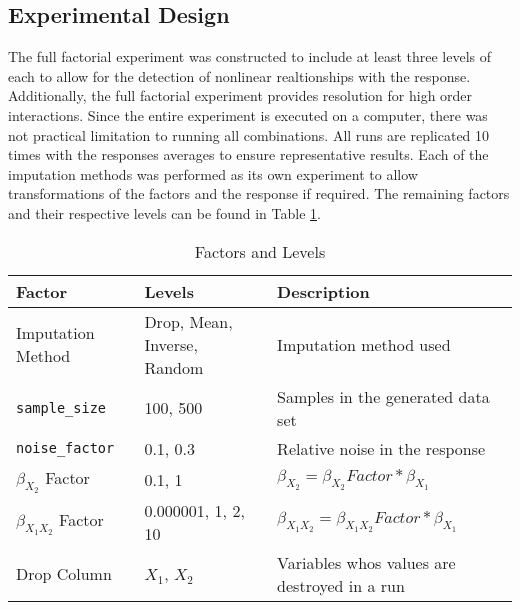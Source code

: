 \documentclass[../../paper.tex]{subfiles}
\begin{document}
\subsection{Experimental Design}
The full factorial experiment was constructed to include at least three levels of each to allow for the detection of nonlinear realtionships with the response.
Additionally, the full factorial experiment provides resolution for high order interactions. Since the entire experiment is executed on a computer, there was not practical limitation to running all combinations.
All runs are replicated 10 times with the responses averages to ensure representative results. Each of the imputation methods was performed as its own experiment to allow transformations of the factors and the response if required. The remaining factors and their respective levels can be found in Table \ref{table:factors_and_levels}.



\begin{table}[H]
\begin{center}\label{table:factors_and_levels}
    \begin{tabular}{  l | p{1.9in} | l   }

      \rule{0pt}{14pt} \textbf{Factor} & \textbf{Levels} & \textbf{Description} \\ \hline
      \rule{0pt}{14pt} Imputation Method & Drop, Mean, Inverse, Random & Imputation method used \\ %
      \rule{0pt}{14pt} \texttt{sample_size} & 100, 500 &  Samples in the generated data set \\ %
      \rule{0pt}{14pt} \texttt{noise_factor} & 0.1, 0.3 &  Relative noise in the response \\ %
      \rule{0pt}{14pt} $\beta_{X_{2}}$ Factor & 0.1, 1 &  $\beta_{X_{2}} = \beta_{X_{2}} Factor * \beta_{X_{1}}$ \\ %
      \rule{0pt}{14pt} $\beta_{X_{1}X_{2}}$ Factor & 0.000001, 1, 2, 10 &  $\beta_{X_{1}X_{2}} = \beta_{X_{1}X_{2}} Factor * \beta_{X_{1}}$ \\ %
      \rule{0pt}{14pt} Drop Column & $X_{1}$, $X_{2}$ & Variables whos values are destroyed in a run \\ %
    \end{tabular}
    \caption{Factors and Levels}\label{table:factors_and_levels}
\end{center}
\end{table}
\end{document}

